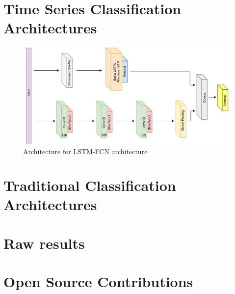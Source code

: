 \chapter{Time Series Classification Architectures}
\label{ch:series-architectures}

\begin{figure}[h]
    \centering
    \includegraphics[width=0.75\linewidth]{dissertation//figures/lstm-fcn.png}
    \caption{Architecture for LSTM-FCN architecture\cite{karim2017lstm}}
    \label{fig:lstm-fcn}
\end{figure}

\chapter{Traditional Classification Architectures}
\label{ch:trad-architectures}

\chapter{Raw results}
\label{ch:raw-results}

\chapter{Open Source Contributions}